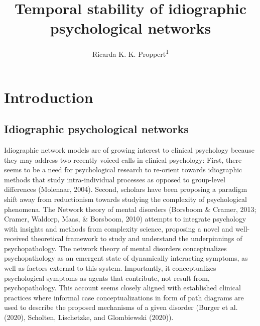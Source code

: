 \documentclass[
  english,
  man]{apa6}
\title{Temporal stability of idiographic psychological networks}
\author{Ricarda K. K. Proppert\textsuperscript{1}}
\date{}
\affiliation{\vspace{0.5cm}\textsuperscript{1} Leiden University, The Netherlands}
\begin{document}
\maketitle

\hypertarget{introduction}{%
\section{Introduction}\label{introduction}}

\hypertarget{idiographic-psychological-networks}{%
\subsection{Idiographic psychological networks}\label{idiographic-psychological-networks}}

Idiographic network models are of growing interest to clinical psychology because they may address two recently voiced calls in clinical psychology: First, there seems to be a need for psychological research to re-orient towards idiographic methods that study intra-individual processes as opposed to group-level differences (Molenaar, 2004).
Second, scholars have been proposing a paradigm shift away from reductionism towards studying the complexity of psychological phenomena.
The Network theory of mental disorders (Borsboom \& Cramer, 2013; Cramer, Waldorp, Maas, \& Borsboom, 2010) attempts to integrate psychology with insights and methods from complexity science, proposing a novel and well-received theoretical framework to study and understand the underpinnings of psychopathology.
The network theory of mental disorders conceptualizes psychopathology as an emergent state of dynamically interacting symptoms, as well as factors external to this system.
Importantly, it conceptualizes psychological symptoms as agents that contribute, not result from, psychopathology.
This account seems closely aligned with established clinical practices where informal case conceptualizations in form of path diagrams are used to describe the proposed mechanisms of a given disorder (Burger et al. (2020), Scholten, Lischetzke, and Glombiewski (2020)).
\end{document}
